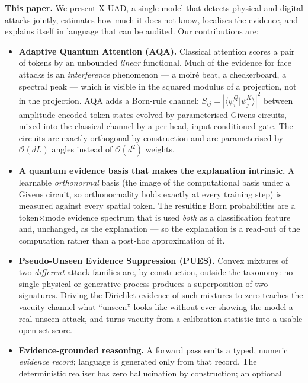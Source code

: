 \documentclass[conference]{IEEEtran}
\newcommand{\braket}[2]{\langle #1 \vert #2 \rangle}
\begin{document}
\noindent\textbf{This paper.} We present X-UAD, a single model that detects
physical and digital attacks jointly, estimates how much it does not know,
localises the evidence, and explains itself in language that can be audited. Our
contributions are:

\begin{itemize}
\item \textbf{Adaptive Quantum Attention (AQA).} Classical attention scores a pair
      of tokens by an unbounded \emph{linear} functional. Much of the evidence for
      face attacks is an \emph{interference} phenomenon --- a moir\'e beat, a
      checkerboard, a spectral peak --- which is visible in the squared modulus of a
      projection, not in the projection. AQA adds a Born-rule channel:
      $S_{ij}=|\braket{\psi^{Q}_{i}}{\psi^{K}_{j}}|^{2}$ between amplitude-encoded
      token states evolved by parameterised Givens circuits, mixed into the
      classical channel by a per-head, input-conditioned gate. The circuits are
      exactly orthogonal by construction and are parameterised by
      $\mathcal{O}(dL)$ angles instead of $\mathcal{O}(d^{2})$ weights.
\item \textbf{A quantum evidence basis that makes the explanation intrinsic.} A
      learnable \emph{orthonormal} basis (the image of the computational basis under
      a Givens circuit, so orthonormality holds exactly at every training step) is
      measured against every spatial token. The resulting Born probabilities are a
      token$\times$mode evidence spectrum that is used \emph{both} as a
      classification feature and, unchanged, as the explanation --- so the
      explanation is a read-out of the computation rather than a post-hoc
      approximation of it.
\item \textbf{Pseudo-Unseen Evidence Suppression (PUES).} Convex mixtures of two
      \emph{different} attack families are, by construction, outside the taxonomy:
      no single physical or generative process produces a superposition of two
      signatures. Driving the Dirichlet evidence of such mixtures to zero teaches
      the vacuity channel what ``unseen'' looks like without ever showing the model
      a real unseen attack, and turns vacuity from a calibration statistic into a
      usable open-set score.
\item \textbf{Evidence-grounded reasoning.} A forward pass emits a typed, numeric
      \emph{evidence record}; language is generated only from that record. The
      deterministic realiser has zero hallucination by construction; an optional

\end{itemize}
\end{document}

